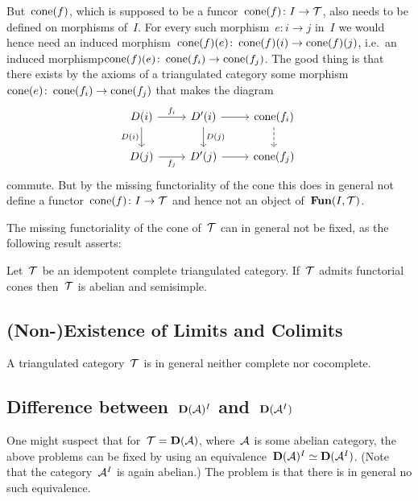 \documentclass[a4paper,10pt]{scrartcl}
\begin{document}
But~$\operatorname{cone}(f)$, which is supposed to be a funcor~$\operatorname{cone}(f) \colon I \to \mathcal{T}$, also needs to be defined on morphisms of~$I$.
For every such morphism~$e \colon i \to j$ in~$I$ we would hence need an induced morphism~$\operatorname{cone}(f)(e) \colon \operatorname{cone}(f)(i) \to \operatorname{cone}(f)(j)$, i.e.\ an induced morphismp$\operatorname{cone}(f)(e) \colon \operatorname{cone}(f_i) \to \operatorname{cone}(f_j)$.
The good thing is that there exists by the axioms of a triangulated category some morphism~$\operatorname{cone}(e) \colon \operatorname{cone}(f_i) \to \operatorname{cone}(f_j)$ that makes the diagram
\[
  \begin{tikzcd}
    D(i)
    \arrow{r}[above]{f_i}
    \arrow{d}[left]{D(i)}
    &
    D'(i)
    \arrow{d}[right]{D(j)}
    \arrow{r}
    &
    \cone(f_i)
    \arrow[dashed]{d}
    \\
    D(j)
    \arrow{r}[below]{f_j}
    &
    D'(j)
    \arrow{r}
    &
    \cone(f_j)
  \end{tikzcd}
\]
commute.
But by the missing functoriality of the cone this does in general not define a functor~$\operatorname{cone}(f) \colon I \to \mathcal{T}$ and hence not an object of~$\mathbf{Fun}(I, \mathcal{T})$.

The missing functoriality of the cone of~$\mathcal{T}$ can in general not be fixed, as the following result asserts:

\begin{proposition}
  Let~$\mathcal{T}$ be an idempotent complete triangulated category.
  If~$\mathcal{T}$ admits functorial cones then~$\mathcal{T}$ is abelian and semisimple.
\end{proposition}



\subsection{(Non-)Existence of Limits and Colimits}

A triangulated category~$\mathcal{T}$ is in general neither complete nor cocomplete.


\subsection{Difference between~$\mathbf{D}(\mathcal{A})^I$ and~$\mathbf{D}(\mathcal{A}^I)$}

One might suspect that for~$\mathcal{T} = \mathbf{D}(\mathcal{A})$, where~$\mathcal{A}$ is some abelian category, the above problems can be fixed by using an equivalence~$\mathbf{D}(\mathcal{A})^I \simeq \mathbf{D}(\mathcal{A}^I)$.
(Note that the category~$\mathcal{A}^I$ is again abelian.)
The problem is that there is in general no such equivalence.
\end{document}
